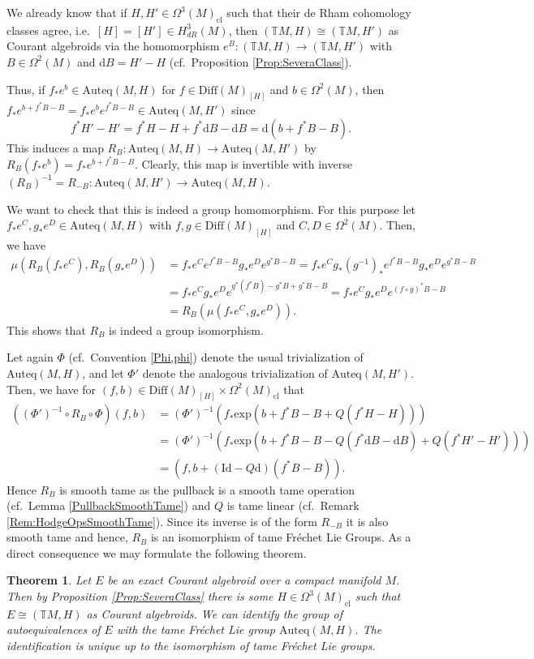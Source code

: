 \documentclass[12pt,a4paper]{article}
\theoremstyle{plain}
\newtheorem{theorem}{Theorem}[subsection]
\theoremstyle{definition}
\newcommand{\Forms}[1]{\Omega^{#1}(M)}
\newcommand{\ClForms}[1]{\Forms{#1}_{\mathrm{cl}}}
\newcommand{\SDiff}{\mathrm{Diff}(M)_{[H]}}
\newcommand{\Auteq}{\mathrm{Auteq}(M,H)}
\newcommand{\GenTM}{\mathbb TM}
\renewcommand{\d}{\mathrm{d}}
\begin{document}
We already know that if $H,H'\in\ClForms{3}$ such that their de Rham cohomology classes agree, i.e.~$[H]=[H']\in H_{dR}^3(M)$, then $(\mathbb{T}M,H)\cong (\mathbb{T}M,H')$ as Courant algebroids via the homomorphism $e^B:(\mathbb{T}M,H)\to (\mathbb{T}M,H')$ with $B\in \Forms{2}$ and $\d B=H'-H$ (cf.~Proposition \ref{Prop:SeveraClass}). 

Thus, if $f_*e^b\in \Auteq$ for $f\in \SDiff$ and $b\in \Forms{2}$, then 
$f_*e^{b+f^*B-B}=f_*e^be^{f^*B-B}\in \mathrm{Auteq}(M,H')$ since $$f^*H'-H'=f^*H-H+f^*\d B-\d B=\d(b+f^*B-B).$$ 
This induces a map $R_B:\Auteq \to \mathrm{Auteq}(M,H')$ by $R_B(f_*e^b)=f_*e^{b+f^*B-B}$. Clearly, this map is invertible with inverse $(R_B)^{-1}=R_{-B}:\mathrm{Auteq}(M,H')\to \Auteq$. 

We want to check that this is indeed a group homomorphism. 
For this purpose let $f_*e^C,g_*e^D\in\mathrm{Auteq}(M,H)$ with $f,g\in \SDiff$ and $C,D\in \Forms{2}$. Then, we have 
\begin{align*}
    \mu(R_B(f_*e^C),R_B(g_*e^D))&=f_*e^Ce^{f^*B-B}g_*e^De^{g^*B-B}=f_*e^Cg_*(g^{-1})_*e^{f^*B-B}g_*e^De^{g^*B-B}\\
    &=f_*e^Cg_*e^De^{g^*(f^*B)-g^*B+g^*B-B}=f_*e^Cg_*e^De^{(f\circ g)^*B-B}\\
    &=R_B(\mu(f_*e^C,g_*e^D)).
\end{align*}
This shows that $R_B$ is indeed a group isomorphism.

Let again $\Phi$ (cf.~Convention \ref{Phi,phi}) denote the usual trivialization of $\Auteq$, and let $\Phi'$ denote the analogous trivialization of $\mathrm{Auteq}(M,H')$. Then, we have for $(f,b)\in \SDiff\times \ClForms{2}$ that 
\begin{align*}
    ((\Phi')^{-1}\circ R_B \circ \Phi)(f,b)&=(\Phi')^{-1}(f_*\mathrm{exp}(b+f^*B-B+Q(f^*H-H)))\\
    &=(\Phi')^{-1}(f_*\mathrm{exp}(b+f^*B-B-Q(f^*\d B-\d B)+Q(f^*H'-H')))\\
    &=(f,b+(\mathrm{Id}-Q\d)(f^*B-B)).
\end{align*}
Hence $R_B$ is smooth tame as the pullback is a smooth tame operation (cf.~Lemma \ref{PullbackSmoothTame}) and $Q$ is tame linear (cf.~Remark \ref{Rem:HodgeOpsSmoothTame}). Since its inverse is of the form $R_{-B}$ it is also smooth tame and hence, $R_B$ is an isomorphism of tame Fréchet Lie Groups.
As a direct consequence we may formulate the following theorem. 

\begin{theorem}
\label{Thm:IsoClassesOfAuteq}
Let $E$ be an exact Courant algebroid over a compact manifold $M$. Then by Proposition \ref{Prop:SeveraClass} there is some $H\in \ClForms{3}$ such that $E\cong (\GenTM,H)$ as Courant algebroids. We can identify the group of autoequivalences of $E$ with the tame Fréchet Lie group $\Auteq$. The identification is unique up to the isomorphism of tame Fréchet Lie groups.
\end{theorem}
\end{document}
